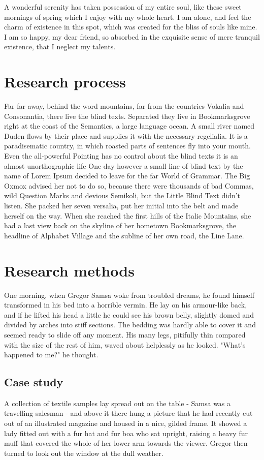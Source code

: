 \documentclass[12pt,a4paper,oneside,pdftex]{report}
\begin{document}
A wonderful serenity has taken possession of my entire soul, like these sweet mornings of spring which I enjoy with my whole heart. I am alone, and feel the charm of existence in this spot, which was created for the bliss of souls like mine. I am so happy, my dear friend, so absorbed in the exquisite sense of mere tranquil existence, that I neglect my talents. 

\section{Research process}

Far far away, behind the word mountains, far from the countries Vokalia and Consonantia, there live the blind texts. Separated they live in Bookmarksgrove right at the coast of the Semantics, a large language ocean. A small river named Duden flows by their place and supplies it with the necessary regelialia. It is a paradisematic country, in which roasted parts of sentences fly into your mouth. Even the all-powerful Pointing has no control about the blind texts it is an almost unorthographic life One day however a small line of blind text by the name of Lorem Ipsum decided to leave for the far World of Grammar. The Big Oxmox advised her not to do so, because there were thousands of bad Commas, wild Question Marks and devious Semikoli, but the Little Blind Text didn’t listen. She packed her seven versalia, put her initial into the belt and made herself on the way. When she reached the first hills of the Italic Mountains, she had a last view back on the skyline of her hometown Bookmarksgrove, the headline of Alphabet Village and the subline of her own road, the Line Lane.

\section{Research methods}

One morning, when Gregor Samsa woke from troubled dreams, he found himself transformed in his bed into a horrible vermin. He lay on his armour-like back, and if he lifted his head a little he could see his brown belly, slightly domed and divided by arches into stiff sections. The bedding was hardly able to cover it and seemed ready to slide off any moment. His many legs, pitifully thin compared with the size of the rest of him, waved about helplessly as he looked. "What's happened to me?" he thought. 

\subsection{Case study}
A collection of textile samples lay spread out on the table - Samsa was a travelling salesman - and above it there hung a picture that he had recently cut out of an illustrated magazine and housed in a nice, gilded frame. It showed a lady fitted out with a fur hat and fur boa who sat upright, raising a heavy fur muff that covered the whole of her lower arm towards the viewer. Gregor then turned to look out the window at the dull weather.
\end{document}
